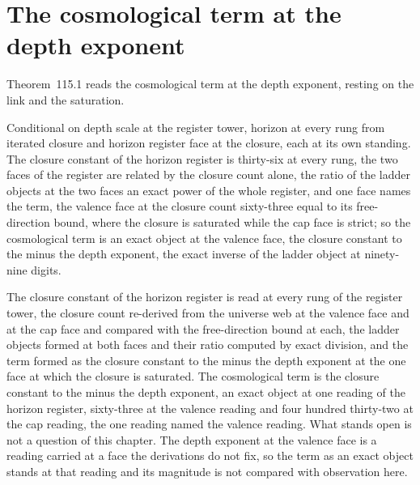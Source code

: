 \section{The cosmological term at the depth exponent}\label{mod:X-6-cosmological-term-at-the-depth-exponent}
\label{narr:open:10-6}Theorem~115.1 reads the cosmological term at the depth exponent, resting on the link and the saturation.
\begin{chconditional}\label{box:X-6-cosmological-term-at-the-depth-exponent:1}
Conditional on depth scale at the register tower, horizon at every rung from iterated closure and horizon register face at the closure, each at its own standing. The closure constant of the horizon register is thirty-six at every rung, the two faces of the register are related by the closure count alone, the ratio of the ladder objects at the two faces an exact power of the whole register, and one face names the term, the valence face at the closure count sixty-three equal to its free-direction bound, where the closure is saturated while the cap face is strict; so the cosmological term is an exact object at the valence face, the closure constant to the minus the depth exponent, the exact inverse of the ladder object at ninety-nine digits.
\end{chconditional}
The closure constant of the horizon register is read at every rung of the register tower, the closure count re-derived from the universe web at the valence face and at the cap face and compared with the free-direction bound at each, the ladder objects formed at both faces and their ratio computed by exact division, and the term formed as the closure constant to the minus the depth exponent at the one face at which the closure is saturated. The cosmological term is the closure constant to the minus the depth exponent, an exact object at one reading of the horizon register, sixty-three at the valence reading and four hundred thirty-two at the cap reading, the one reading named the valence reading. What stands open is not a question of this chapter. The depth exponent at the valence face is a reading carried at a face the derivations do not fix, so the term as an exact object stands at that reading and its magnitude is not compared with observation here.
